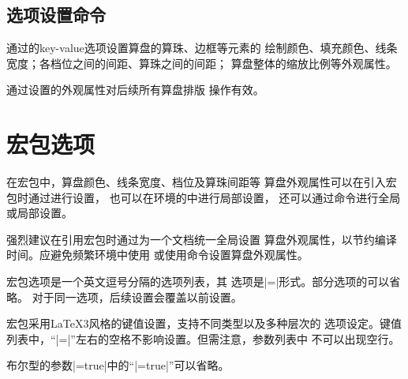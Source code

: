 \documentclass[full]{l3doc}
\begin{document}
\begin{documentation}
\subsection{选项设置命令}

\begin{function}{\suanpanset}
  \begin{syntax}
     
  \end{syntax}
\end{function}

  通过的key-value选项设置算盘的算珠、边框等元素的
  绘制颜色、填充颜色、线条宽度；各档位之间的间距、算珠之间的间距；
  算盘整体的缩放比例等外观属性。

  通过设置的外观属性对后续所有算盘排版
  操作有效。


\section{宏包选项}

在宏包中，算盘颜色、线条宽度、档位及算珠间距等
算盘外观属性可以在引入宏包时通过进行设置，
也可以在环境的中进行局部设置，
还可以通过命令进行全局或局部设置。

强烈建议在引用宏包时通过为一个文档统一全局设置
算盘外观属性，以节约编译时间。应避免频繁环境中使用
或使用命令设置算盘外观属性。

宏包选项是一个英文逗号分隔的选项列表，其
选项是|=|形式。部分选项的可以省略。
对于同一选项，后续设置会覆盖以前设置。

宏包采用\LaTeX3风格的键值设置，支持不同类型以及多种层次的
选项设定。键值列表中，``|=|''左右的空格不影响设置。但需注意，参数列表中%
\textsf{不可以出现空行}。

布尔型的参数|=true|中的``|=true|''可以省略。



\end{documentation}
\end{document}
